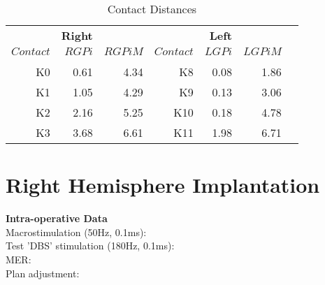 \documentclass[12pt,fullpage]{article}
\begin{document}
\begin{table}[h!]
  \begin{center}
    \caption{Contact Distances}
    \label{tab:table1}
    \begin{tabular}{r|r|r|r|r|r|r}
     
      \toprule 
     
      \textbf{} & \textbf{Right} &  & & \textbf{Left} \\
     
     
$Contact$ & $RGPi$ & $RGPiM$ & $Contact$ &$LGPi$ & $LGPiM$ \\ 

\midrule \\

K0 & 0.61 & 4.34 & K8 & 0.08 & 1.86 \\ 

K1 & 1.05 & 4.29 & K9 & 0.13 & 3.06 \\ 

K2 & 2.16 & 5.25 & K10 & 0.18 & 4.78 \\ 

K3 & 3.68 & 6.61 & K11 & 1.98 & 6.71 \\ 

      \bottomrule 
      
    \end{tabular}
  \end{center}
\end{table}


\pagebreak

\section{Right Hemisphere Implantation} 

\textbf{Intra-operative Data}\\
	
\noindent Macrostimulation (50Hz, 0.1ms): \\
Test 'DBS' stimulation (180Hz, 0.1ms): \\
MER: \\
Plan adjustment: \\


\end{document}

